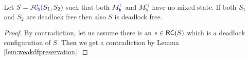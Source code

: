 %

\begin{corollary}%
\label{prop:weakdfPreservation}
Let $S = {\mathcal{F}\!\mathcal{C}}_{\!{\mathtt{\color{blue}{ {h}}}}}(S_1,S_2)$ such that
both $M^1_{\mathtt{\color{blue}{ {h}}}}$ and $M^2_{\mathtt{\color{blue}{ {h}}}}$ have no mixed state.
If both $S_1$ and $S_2$ are deadlock free then also $S$ is deadlock free.
\end{corollary}
\begin{proof}
By contradiction, let us assume there is an $s\in \mathsf{RC}(S)$ which is a deadlock configuration of $S$. Then we get a contradiction by Lemma \ref{lem:weakdfpreservation}.
\end{proof}











